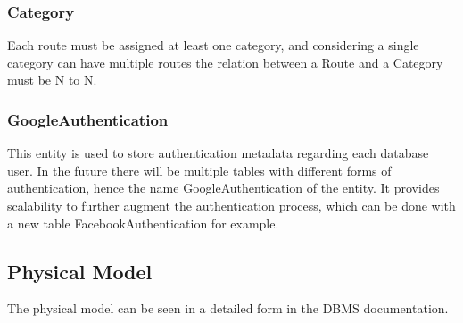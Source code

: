         \subsubsection*{Category}
        Each route must be assigned at least one category, and considering a single category can have multiple routes
        the relation between a Route and a Category must be N to N.

        \subsubsection*{GoogleAuthentication}
        This entity is used to store authentication metadata regarding each database user. In the future there
        will be multiple tables with different forms of authentication, hence the name GoogleAuthentication 
        of the entity. It provides scalability to further augment the authentication process, which can be done
        with a new table FacebookAuthentication for example.

    \subsection*{Physical Model}
    The physical model can be seen in a detailed form in the DBMS documentation.\cite{servicedbms}

